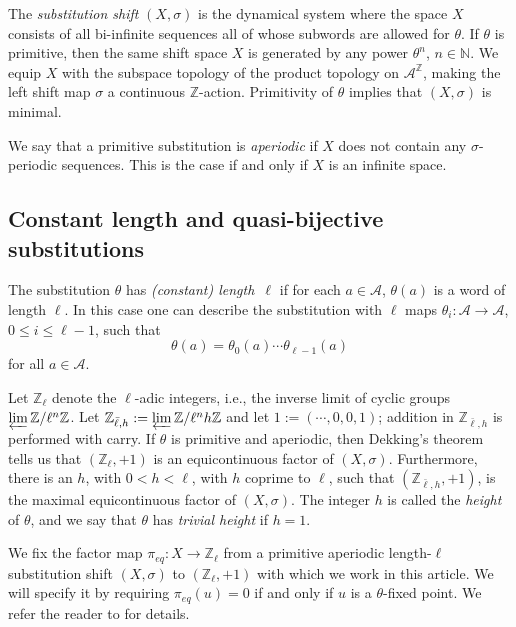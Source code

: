 \documentclass[12pt]{amsart}
\theoremstyle{definition}
\numberwithin{equation}{section}
\newcommand{\Z}{\mathbb Z}
\newcommand{\N}{\mathbb N}
\newcommand{\Aa}{{\mathcal A}}
\newcommand{\pe}{\pi_{eq}}
\begin{document}
The {\em substitution shift} $( X,  \sigma)$ is the dynamical system where the space $X$  consists of all bi-infinite sequences 
all of whose subwords are allowed for $\theta$. If $\theta$ is primitive, then the same shift space $X$ is generated by any power $\theta^n$,  $n\in \N$.
We equip $X$ with the subspace topology of the product topology on $\Aa^\Z$, making the left shift map $\sigma$  a continuous  $\Z$-action. Primitivity  of $\theta$ implies that $(X,\sigma)$ is minimal.
    

We say that a primitive substitution is {\em aperiodic} if $X$ does not contain any $\sigma$-periodic sequences. This is the case if and only if $X$ is an infinite space. 


\subsection{Constant length and quasi-bijective substitutions }\label{def:quasi-bijective}

The substitution $\theta$ has
{\em (constant) length~$\ell$}  if for each $a\in \mathcal A$, 
$\theta (a)$ is a word of length $\ell$. In this case one can describe the substitution with  $\ell$ maps $\theta_i:\mathcal A \rightarrow \mathcal A$, $0\leq i \leq \ell-1$, such that
\begin{equation}\label{eq-as-perm}\nonumber
\theta(a) = \theta_0(a)\cdots \theta_{\ell-1}(a)
\end{equation}
for all $a\in\Aa$.

 Let $\Z_\ell$ denote the  $\ell$-adic integers, i.e., the inverse limit of cyclic groups $ \varprojlim \Z/\ell^n\Z $.  Let  $\Z_{\bar{\ell},h} :=  \varprojlim \Z/\ell^nh\Z $  and let $1 := (\cdots, 0,0,1)$; addition in $\Z_{\bar{\ell},h}$ is performed with carry.   
If $\theta$ is primitive and aperiodic, then Dekking's theorem \cite{dekking} tells us that   $(\Z_\ell, +1)$ is an equicontinuous factor of $(X, \sigma)$. Furthermore, 
there is an $h$, with $0<h<\ell$, with $h$ coprime to $\ell$, such that 
 $(\mathbb{Z}_{\bar{\ell},h}, +1)$, is  the maximal equicontinuous factor of  $(X, \sigma)$. The integer $h$ is called the {\em height} of $\theta$, and   we say that  $\theta$ has {\em trivial height} if $h=1$.

   We fix the factor map $\pe:X\rightarrow \Z_\ell$ from a primitive aperiodic length-$\ell$ substitution shift $(X,\sigma)$ to $(\Z_\ell,+1)$ with which we work in this article. We will specify it by requiring $\pe(u)=0$ if and only if $u$ is a $\theta$-fixed point. We refer the reader to \cite{dekking} for details.
\end{document}

